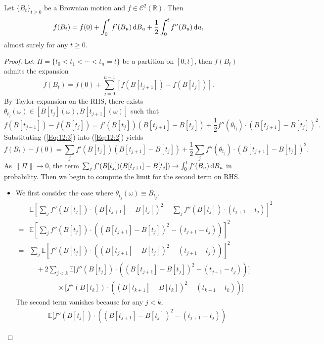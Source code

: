 \begin{theorem}\label{The:12:1}
Let $\{B_t\}_{t\ge0}$ be a Brownian motion and $f\in\mathcal{C}^2(\mathbb{R})$.
Then
\[
f(B_t) = f(0) + \int_0^tf'(B_u)\,\mathrm{d} B_u + \frac{1}{2}\int_0^tf''(B_u)\,\mathrm{d} u,
\]
almost surely for any $t\ge0$.
\end{theorem}
\begin{proof}
Let $\Pi=\{t_0<t_1<\cdots<t_n=t\}$ be a partition on $[0,t]$, then $f(B_t)$ admits the expansion
\begin{equation}\label{Eq:12:2}
f(B_t) = f(0) + \sum_{j=0}^{n-1}[f(B[t_{j+1}])- f(B[t_j])].
\end{equation}
By Taylor expansion on the RHS, there exists $\theta_{t_j}(\omega)\in[B[t_j](\omega), B[t_{j+1}](\omega)]$ such that
\begin{equation}\label{Eq:12:3}
f(B[t_{j+1}])- f(B[t_j]) = f'(B[t_j])(B[t_{j+1}] - B[t_{j}]) + \frac{1}{2}f''(\theta_{t_j})\cdot(B[t_{j+1}] - B[t_{j}])^2.
\end{equation}
Substituting (\eqref{Eq:12:3}) into (\ref{Eq:12:2}) yields
\[
f(B_t) - f(0) = \sum_jf'(B[t_j])(B[t_{j+1}] - B[t_{j}]) + \frac{1}{2}\sum_jf''(\theta_{t_j})\cdot(B[t_{j+1}] - B[t_{j}])^2.
\]
As $\|\Pi\|\to0$, the term $\sum_jf'(B[t_j])(B[t_{j+1}] - B[t_{j}])\to \int_0^tf'(B_u)\,\mathrm{d} B_u$ in probability.
Then we begin to compute the limit for the second term on RHS.
\begin{itemize}
\item
We first consider the case where $\theta_{t_j}(\omega)\equiv B_{t_j}$.
\begin{align*}
&\mathbb{E}\left[
\sum_jf''(B[t_{j}])\cdot(B[t_{j+1}] - B[t_{j}])^2
-
\sum_jf''(B[t_{j}])\cdot(t_{j+1}-t_{j})
\right]^2\\
=&
\mathbb{E}\left[
\sum_jf''(B[t_{j}])\cdot\left((B[t_{j+1}] - B[t_{j}])^2
-(t_{j+1}-t_{j})\right)
\right]^2\\
=&\sum_j\mathbb{E}\left[
f''(B[t_{j}])\cdot\left((B[t_{j+1}] - B[t_{j}])^2
-(t_{j+1}-t_{j})\right)
\right]^2\\
&\quad + 2\sum_{j<k}\mathbb{E}\bigg[
f''(B[t_{j}])\cdot\left((B[t_{j+1}] - B[t_{j}])^2
-(t_{j+1}-t_{j})\right)
\bigg]\\
&\qquad\qquad \times\bigg[
f''(B[t_{k}])\cdot\left((B[t_{k+1}] - B[t_{k}])^2
-(t_{k+1}-t_{k})\right)
\bigg]
\end{align*}
The second term vanishes because for any $j<k$, 
\begin{align*}
&\mathbb{E}\bigg[
f''(B[t_{j}])\cdot\left((B[t_{j+1}] - B[t_{j}])^2
-(t_{j+1}-t_{j})\right)

\end{align*}
\end{itemize}
\end{proof}
